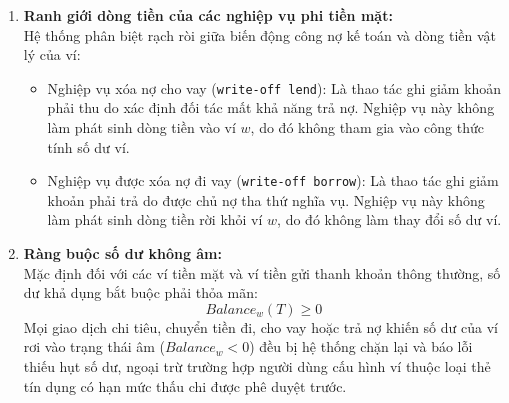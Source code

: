 \documentclass[11pt,a4paper]{article}
\providecommand{\tightlist}{
  \setlength{\itemsep}{0pt}\setlength{\parskip}{0pt}}
\begin{document}
\begin{enumerate}
  \begin{itemize}
  \tightlist
  \item
    \(Balance_w(0)\): Số dư khởi tạo ban đầu của ví \(w\).
  \item
    \(Income_w(t)\): Các khoản thu nhập phát sinh trực tiếp vào ví
    \(w\).
  \item
    \(Expense_w(t)\): Các khoản chi tiêu chi trả trực tiếp từ ví \(w\).
  \item
    \(TransferIn_w(t)\): Các khoản tiền chuyển từ ví khác đến ví \(w\).
  \item
    \(TransferOut_w(t)\): Các khoản tiền chuyển từ ví \(w\) sang ví
    khác.
  \item
    \(Borrow_w(t)\): Các khoản tiền đi vay nhận về nhập vào ví \(w\)
    (dòng tiền dương).
  \item
    \(Repay_w(t)\): Các khoản tiền trả nợ đã vay trích xuất từ ví \(w\)
    (dòng tiền âm).
  \item
    \(Lend_w(t)\): Các khoản tiền cho người khác vay trích xuất từ ví
    \(w\) (dòng tiền âm).
  \item
    \(Collect_w(t)\): Các khoản tiền thu hồi nợ cho vay nhận về nhập vào
    ví \(w\) (dòng tiền dương).
  \end{itemize}
\item
  \textbf{Ranh giới dòng tiền của các nghiệp vụ phi tiền mặt:}\\
  Hệ thống phân biệt rạch ròi giữa biến động công nợ kế toán và dòng
  tiền vật lý của ví:

  \begin{itemize}
  \tightlist
  \item
    Nghiệp vụ xóa nợ cho vay (\texttt{write-off\ lend}): Là thao tác ghi
    giảm khoản phải thu do xác định đối tác mất khả năng trả nợ. Nghiệp
    vụ này không làm phát sinh dòng tiền vào ví \(w\), do đó không tham
    gia vào công thức tính số dư ví.
  \item
    Nghiệp vụ được xóa nợ đi vay (\texttt{write-off\ borrow}): Là thao
    tác ghi giảm khoản phải trả do được chủ nợ tha thứ nghĩa vụ. Nghiệp
    vụ này không làm phát sinh dòng tiền rời khỏi ví \(w\), do đó không
    làm thay đổi số dư ví.
  \end{itemize}
\item
  \textbf{Ràng buộc số dư không âm:}\\
  Mặc định đối với các ví tiền mặt và ví tiền gửi thanh khoản thông
  thường, số dư khả dụng bắt buộc phải thỏa mãn: \[Balance_w(T) \ge 0\]
  Mọi giao dịch chi tiêu, chuyển tiền đi, cho vay hoặc trả nợ khiến số
  dư của ví rơi vào trạng thái âm (\(Balance_w < 0\)) đều bị hệ thống
  chặn lại và báo lỗi thiếu hụt số dư, ngoại trừ trường hợp người dùng
  cấu hình ví thuộc loại thẻ tín dụng có hạn mức thấu chi được phê duyệt
  trước.
\end{enumerate}
\end{document}
